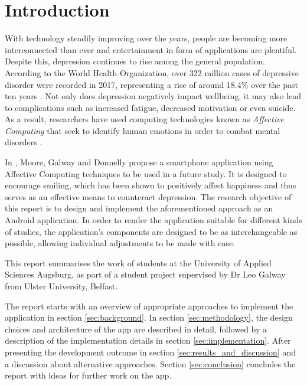 \section{Introduction} \label{sec:introduction}
With technology steadily improving over the years, people are becoming more interconnected than ever and entertainment in form of applications are plentiful. Despite this, depression continues to rise among the general population.
According to the World Health Organization, over 322 million cases of depressive disorder were recorded in 2017, representing a rise of around 18.4\% over the past ten years \cite{who_depression}.
Not only does depression negatively impact wellbeing, it may also lead to complications such as increased fatigue, decreased motivation or even suicide.
As a result, researchers have used computing technologies known as \textit{Affective Computing} that seek to identify human emotions in order to combat mental disorders \cite{ieee_affective}.

In \cite{sohappy}, Moore, Galway and Donnelly propose a smartphone application using Affective Computing techniques to be used in a future study.
It is designed to encourage smiling, which has been shown to positively affect happiness and thus serves as an effective means to counteract depression.
The research objective of this report is to design and implement the aforementioned approach as an Android application.
In order to render the application suitable for different kinds of studies, the application's components are designed to be as interchangeable as possible, allowing individual adjustments to be made with ease.

This report summarises the work of students at the University of Applied 
Sciences Augsburg, as part of a student project supervised by Dr Leo Galway
from Ulster University, Belfast.

The report starts with an overview of appropriate approaches to implement the application in section \ref{sec:background}.
In section \ref{sec:methodology}, the design choices and architecture of the app are described in detail, followed by a description of the implementation details in section \ref{sec:implementation}.
After presenting the development outcome in section \ref{sec:results_and_discussion} and a discussion about alternative approaches. Section \ref{sec:conclusion} concludes the report with ideas for further work on the app.

